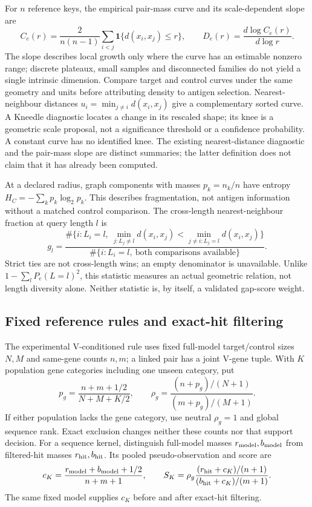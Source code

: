\documentclass[10pt,a4paper]{article}
\theoremstyle{definition}
\begin{document}
For $n$ reference keys, the empirical pair-mass curve and its scale-dependent slope are
\[
 C_e(r)=\frac{2}{n(n-1)}\sum_{i<j}\mathbf1\{d(x_i,x_j)\le r\},
 \qquad D_e(r)=\frac{d\log C_e(r)}{d\log r}.
\]
The slope describes local growth only where the curve has an estimable nonzero range; discrete plateaux, small samples and disconnected families do not yield a single intrinsic dimension.
Compare target and control curves under the same geometry and units before attributing density to antigen selection.
Nearest-neighbour distances $u_i=\min_{j\ne i}d(x_i,x_j)$ give a complementary sorted curve.
A Kneedle diagnostic locates a change in its rescaled shape; its knee is a geometric scale proposal, not a significance threshold or a confidence probability.
A constant curve has no identified knee.
The existing nearest-distance diagnostic and the pair-mass slope are distinct summaries; the latter definition does not claim that it has already been computed.

At a declared radius, graph components with masses $p_k=n_k/n$ have entropy $H_C=-\sum_kp_k\log_2p_k$.
This describes fragmentation, not antigen information without a matched control comparison.
The cross-length nearest-neighbour fraction at query length $l$ is
\[
 g_l=\frac{\#\{i:L_i=l,\ \min_{j:L_j\ne l}d(x_i,x_j)
                      <\min_{j\ne i:L_j=l}d(x_i,x_j)\}}
             {\#\{i:L_i=l,\ \text{both comparisons available}\}}.
\]
Strict ties are not cross-length wins; an empty denominator is unavailable.
Unlike $1-\sum_lP_e(L=l)^2$, this statistic measures an actual geometric relation, not length diversity alone.
Neither statistic is, by itself, a validated gap-score weight.

\subsection{Fixed reference rules and exact-hit filtering}
The experimental V-conditioned rule uses fixed full-model target/control sizes $N,M$ and same-gene counts $n,m$; a linked pair has a joint V-gene tuple.
With $K$ population gene categories including one unseen category, put
\[
 p_g=\frac{n+m+1/2}{N+M+K/2},\qquad
 \rho_g=\frac{(n+p_g)/(N+1)}{(m+p_g)/(M+1)}.
\]
If either population lacks the gene category, use neutral $\rho_g=1$ and global sequence rank.
Exact exclusion changes neither these counts nor that support decision.
For a sequence kernel, distinguish full-model masses $r_{\rm model},b_{\rm model}$ from filtered-hit masses $r_{\rm hit},b_{\rm hit}$.
Its pooled pseudo-observation and score are
\[
 c_K=\frac{r_{\rm model}+b_{\rm model}+1/2}{n+m+1},\qquad
 S_K=\rho_g\frac{(r_{\rm hit}+c_K)/(n+1)}{(b_{\rm hit}+c_K)/(m+1)}.
\]
The same fixed model supplies $c_K$ before and after exact-hit filtering.
\end{document}
